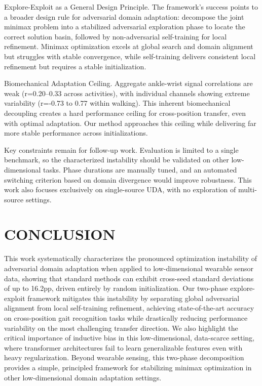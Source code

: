 \documentclass[conference]{IEEEtran}
\begin{document}
Explore-Exploit as a General Design Principle. The framework’s success points to a broader design rule for adversarial domain adaptation: decompose the joint minimax problem into a stabilized adversarial exploration phase to locate the correct solution basin, followed by non-adversarial self-training for local refinement. Minimax optimization excels at global search and domain alignment but struggles with stable convergence, while self-training delivers consistent local refinement but requires a stable initialization.

Biomechanical Adaptation Ceiling. Aggregate ankle-wrist signal correlations are weak (r=0.20–0.33 across activities), with individual channels showing extreme variability (r=-0.73 to 0.77 within walking). This inherent biomechanical decoupling creates a hard performance ceiling for cross-position transfer, even with optimal adaptation. Our method approaches this ceiling while delivering far more stable performance across initializations.

Key constraints remain for follow-up work. Evaluation is limited to a single benchmark, so the characterized instability should be validated on other low-dimensional tasks. Phase durations are manually tuned, and an automated switching criterion based on domain divergence would improve robustness. This work also focuses exclusively on single-source UDA, with no exploration of multi-source settings.

\section{CONCLUSION}
\label{sec:conclusion}

This work systematically characterizes the pronounced optimization instability of adversarial domain adaptation when applied to low-dimensional wearable sensor data, showing that standard methods can exhibit cross-seed standard deviations of up to 16.2pp, driven entirely by random initialization. Our two-phase explore-exploit framework mitigates this instability by separating global adversarial alignment from local self-training refinement, achieving state-of-the-art accuracy on cross-position gait recognition tasks while drastically reducing performance variability on the most challenging transfer direction. We also highlight the critical importance of inductive bias in this low-dimensional, data-scarce setting, where transformer architectures fail to learn generalizable features even with heavy regularization. Beyond wearable sensing, this two-phase decomposition provides a simple, principled framework for stabilizing minimax optimization in other low-dimensional domain adaptation settings.
\end{document}
